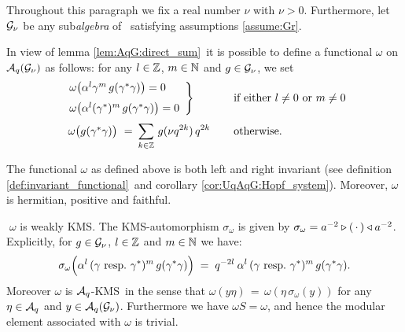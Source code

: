 Throughout this paragraph we fix a real number $\nu$ with $\nu >0$. Furthermore,
let $\mathcal G_\nu$ be any sub{\em algebra\/} of \HC\ satisfying assumptions \ref{assume:Gr}\@.

\begin{defn*}
In view of lemma \ref{lem:AqG:direct_sum}\ it is possible to
define a functional $\omega$ on ${\mathcal A}_q(\mathcal G_\nu)$ as follows:
for any $l\in \mathbb{Z}$, $m\in\mathbb{N}$ and $g\in \mathcal G_\nu$, we set
\begin{equation}\label{eq:def:Haar:AqG}
  \begin{array}{ll}
    \left. \begin{array}{l}
      \omega \!\left(\alpha^l \gamma^m \,g(\gamma^*\gamma) \right) = 0 \\
                       \vertXL
      \omega \!\left(\alpha^l (\gamma^*)^m \,g(\gamma^*\gamma) \right) = 0
    \end{array} \right\}  & \mbox{if either $l\neq 0$ or $m\neq 0$} \\
    \;\: \omega \!\left(g(\gamma^*\gamma)\vertM \right) \vertXXL
           \,=\: \displaystyle \sum_{k\in\ZZ} \, g(\nu q^{2k})\, q^{2k}
           \hspace{4mm} & \mbox{otherwise.}
  \end{array}
\end{equation}
\end{defn*}



\begin{prop} \label{prop:haar:Aq}
The functional\/ $\omega$ as defined above is both left and right
invariant (see definition \ref{def:invariant_functional}\ and
corollary \ref{cor:UqAqG:Hopf_system}).
Moreover, $\omega$ is hermitian, positive and faithful.
\end{prop}


\begin{prop} \label{prop:Aq:KMS}
$\;\omega$ is weakly {\scriptsize KMS}\@.
The {\scriptsize KMS}-automorphism\/ $\sigma_\omega$ is given by\/
$\sigma_\omega = a^{-2} \triangleright (\,\cdot\,) \triangleleft a^{-2}$.
Explicitly, for\/ $g\in \mathcal G_\nu$, $l\in \mathbb{Z}$ and\/ $m \in \mathbb{N}$ we have:
$$\sigma_\omega \!\left( \alpha^l \,(\gamma \mbox{ resp.\ } \gamma^*)^m
                   \,g(\gamma^*\gamma)  \vertL \right)
 \;=\;   q^{-2l} \: \alpha^l \, (\gamma \mbox{ resp.\ } \gamma^*)^m
                 \,g(\gamma^*\gamma). $$
Moreover\/ $\omega$ is\/ ${\mathcal A}_q$-{\scriptsize KMS}\ in the sense that\/
$\omega(y \eta) \,=\, \omega(\eta \, \sigma_\omega(y))$ for any\/ $\eta \in {\mathcal A}_q$
and\/ $y \in {\mathcal A}_q(\mathcal G_\nu)$. Furthermore we have\/ $\omega S = \omega$,
and hence the modular element associated with\/ $\omega$ is trivial.
\end{prop}


